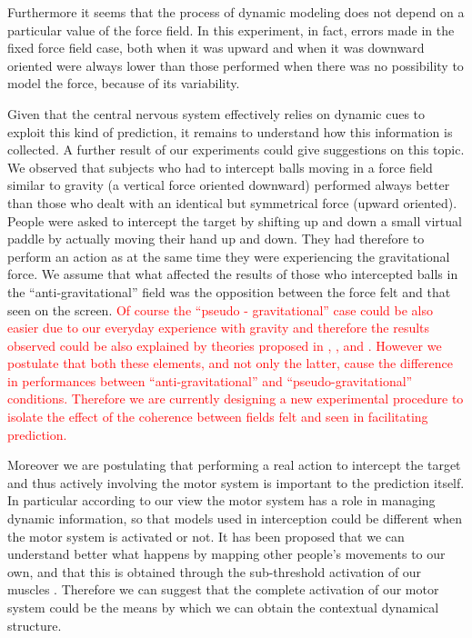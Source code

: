Furthermore it seems that the process of dynamic modeling does not depend on a particular value of the force field. In this experiment, in fact, errors made in the fixed force field case, both when it was upward and when it was downward oriented were always lower than those performed when there was no possibility to model the force, because of its variability. 

Given that the central nervous system effectively relies on dynamic cues to exploit this kind of prediction, it remains to understand how this information is collected. A further result of our experiments could give suggestions on this topic.
We observed that subjects who had to intercept balls moving in a force field similar to gravity (a vertical force  oriented downward) performed always better than those who dealt with an identical but symmetrical force (upward oriented). People were asked to intercept the target by shifting up and down a small virtual paddle by actually moving their hand up and down. They had therefore to perform an action as at the same time they were experiencing the gravitational force. We assume that what affected the results of those who intercepted balls in the ``anti-gravitational'' field was the opposition between the force felt and that seen on the screen. 
\textcolor{red}{Of course the ``pseudo - gravitational'' case could be also easier due to our everyday experience with gravity and therefore the results observed could be also explained by theories proposed in \citep{McIntyre}, \citep{Lacquaniti}, \citep{Lacquaniti_internal} and \citep{McIntyre2}. However we postulate that both these elements, and not only the latter, cause the difference in performances between ``anti-gravitational'' and ``pseudo-gravitational''  conditions.
Therefore we are currently designing a new experimental procedure to isolate the effect of the coherence between fields felt and seen in facilitating prediction.}


Moreover we are postulating that performing a real action to intercept the target and thus actively involving the motor system is important to the prediction itself. In particular according to our view the motor system has a role in managing dynamic information, so that models used in interception could be different when the motor system is activated or not.
It has been proposed that we can understand better what happens by mapping other people's movements to our own, and that this is obtained through the sub-threshold activation of our muscles \citep{Wolpert_social}. Therefore we can suggest that the complete activation of our motor system could be the means by which we can obtain the contextual dynamical structure.


